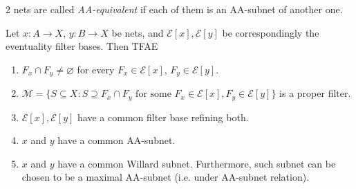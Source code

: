 \documentclass{treatise}
\begin{document}
2 nets are called \emph{AA-equivalent} if each of them is an AA-subnet of another one.
\begin{lemma}
Let $x: A \to X$, $y: B \to X$ be nets, and $\mathcal{E}[x], \mathcal{E}[y]$ be correspondingly the eventuality filter bases. Then TFAE
\begin{enumerate}
    \item $F_x \cap F_y \neq \varnothing$ for every $F_x \in \mathcal{E}[x]$, $F_y \in \mathcal{E}[y]$.
    \item $\mathcal{M} = \{ S \subseteq X : S \supseteq F_x \cap F_y \mbox{ for some } F_x \in \mathcal{E}[x], F_y \in \mathcal{E}[y] \}$ is a proper filter.
    \item $\mathcal{E}[x], \mathcal{E}[y]$ have a common filter base refining both.
    \item $x$ and $y$ have a common AA-subnet.
    \item $x$ and $y$ have a common Willard subnet. Furthermore, such subnet can be chosen to be a maximal AA-subnet (i.e. under AA-subnet relation).
\end{enumerate}
\end{lemma}
\end{document}
